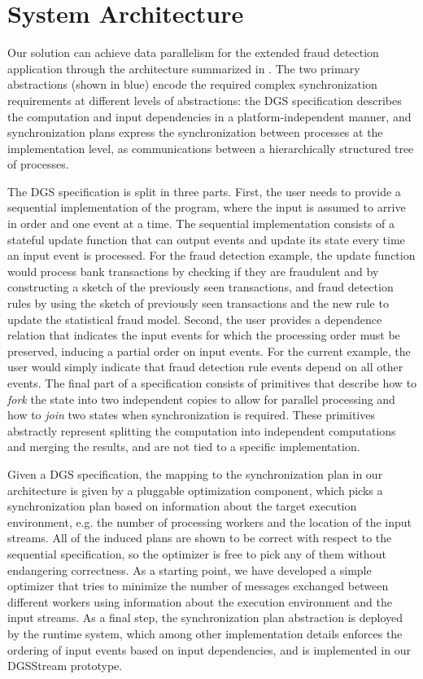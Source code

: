 \section{System Architecture}
\label{dgs:ssec:solution-architecture}

Our solution can achieve data parallelism for the extended fraud
detection application through the architecture
summarized in .
The two primary abstractions (shown in blue) encode the required complex synchronization requirements at different levels of abstractions:
the DGS specification describes the computation and input dependencies
in a platform-independent manner,
and synchronization plans express the synchronization
between processes at the implementation level,
as communications between a hierarchically structured tree of processes.

The DGS specification is split in three parts.
First, the user
needs to provide a sequential implementation of the program, where the
input is assumed to arrive in order and one event at a time. The
sequential implementation consists of a stateful update function that
can output events and update its state every time an input event is
processed. For the fraud detection example, the update function would
process bank transactions by checking if they are fraudulent and by
constructing a sketch of the previously seen transactions, and fraud
detection rules by using the sketch of previously seen transactions
and the new rule to update the statistical fraud model. Second, the
user provides a dependence relation that indicates the input events
for which the processing order must be preserved, inducing a partial
order on input events. For the current example, the user would simply
indicate that fraud detection rule events depend on all other
events. The final part of a specification consists of primitives that
describe how to \emph{fork} the state into two independent copies to
allow for parallel processing and how to \emph{join} two states when
synchronization is required. These primitives abstractly represent
splitting the computation into independent computations and merging
the results, and are not tied to a specific implementation.

Given a DGS specification,
the mapping to the synchronization plan in our architecture
is given by a pluggable optimization component, which picks
a synchronization plan based on information about the target execution
environment, e.g. the number of processing workers and the location of
the input streams. All of the induced plans are shown to be correct with respect to the sequential specification, so the optimizer is free to pick any of them without endangering correctness. As a starting point, we have developed a simple
optimizer that tries to minimize the number of messages exchanged
between different workers using information about the execution
environment and the input streams.
As a final step, the synchronization plan abstraction
is deployed by the runtime system,
which among other implementation details enforces the ordering of input events based on input dependencies,
and is implemented in our DGSStream prototype.

